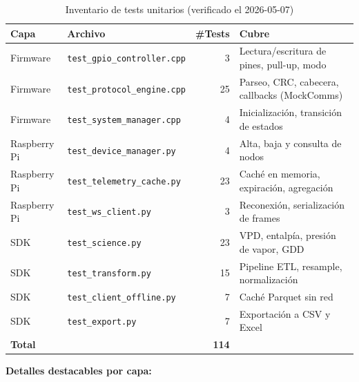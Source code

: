 \begin{table}[H]
    \centering
    \caption{Inventario de tests unitarios (verificado el 2026-05-07)}
    \begin{tabularx}{\textwidth}{lXrl}
        \toprule
        \textbf{Capa}           & \textbf{Archivo}                      & \textbf{\#Tests} & \textbf{Cubre} \\
        \midrule
        Firmware                & \texttt{test\_gpio\_controller.cpp}   & 3   & Lectura/escritura de pines, pull-up, modo \\
        Firmware                & \texttt{test\_protocol\_engine.cpp}   & 25  & Parseo, CRC, cabecera, callbacks (MockComms) \\
        Firmware                & \texttt{test\_system\_manager.cpp}    & 4   & Inicialización, transición de estados \\
        Raspberry Pi            & \texttt{test\_device\_manager.py}     & 4   & Alta, baja y consulta de nodos \\
        Raspberry Pi            & \texttt{test\_telemetry\_cache.py}    & 23  & Caché en memoria, expiración, agregación \\
        Raspberry Pi            & \texttt{test\_ws\_client.py}          & 3   & Reconexión, serialización de frames \\
        SDK                     & \texttt{test\_science.py}             & 23  & VPD, entalpía, presión de vapor, GDD \\
        SDK                     & \texttt{test\_transform.py}           & 15  & Pipeline ETL, resample, normalización \\
        SDK                     & \texttt{test\_client\_offline.py}     & 7   & Caché Parquet sin red \\
        SDK                     & \texttt{test\_export.py}              & 7   & Exportación a CSV y Excel \\
        \midrule
        \textbf{Total}          &                                       & \textbf{114} & \\
        \bottomrule
    \end{tabularx}
    \label{tab:tests_unit}
\end{table}

\textbf{Detalles destacables por capa:}

